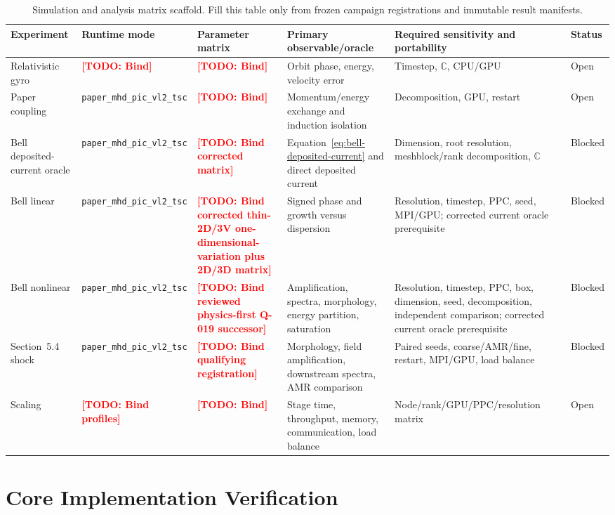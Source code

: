 \documentclass[twocolumn]{aastex701}
\newcommand{\runtime}{\texttt{paper\_mhd\_pic\_vl2\_tsc}\xspace}
\newcommand{\TODO}[1]{\textcolor{red}{\textbf{[TODO: #1]}}}
\begin{document}
\begin{table}[htbp]
\centering
\caption{Simulation and analysis matrix scaffold. Fill this table only from
frozen campaign registrations and immutable result manifests.}
\label{tab:simulation-matrix}
\small
\begin{tabular}{p{} p{} p{}
                p{} p{} p{}}
\toprule
Experiment & Runtime mode & Parameter matrix & Primary observable/oracle &
Required sensitivity and portability & Status \\
\midrule
Relativistic gyro & \TODO{Bind} & \TODO{Bind} &
Orbit phase, energy, velocity error & Timestep, $\mathbb{C}$, CPU/GPU &
Open \\
Paper coupling & \runtime & \TODO{Bind} &
Momentum/energy exchange and induction isolation & Decomposition, GPU, restart &
Open \\
Bell deposited-current oracle & \runtime & \TODO{Bind corrected matrix} &
Equation~\ref{eq:bell-deposited-current} and direct deposited current &
Dimension, root resolution, meshblock/rank decomposition, $\mathbb{C}$ &
Blocked \\
Bell linear & \runtime & \TODO{Bind corrected thin-2D/3V one-dimensional-
variation plus 2D/3D matrix} &
Signed phase and growth versus dispersion & Resolution, timestep, PPC, seed,
MPI/GPU; corrected current oracle prerequisite & Blocked \\
Bell nonlinear & \runtime & \TODO{Bind reviewed physics-first Q-019 successor} &
Amplification, spectra, morphology, energy partition, saturation &
Resolution, timestep, PPC, box, dimension, seed, decomposition, independent
comparison; corrected current oracle prerequisite & Blocked \\
Section~5.4 shock & \runtime & \TODO{Bind qualifying registration} &
Morphology, field amplification, downstream spectra, AMR comparison &
Paired seeds, coarse/AMR/fine, restart, MPI/GPU, load balance & Blocked \\
Scaling & \TODO{Bind profiles} & \TODO{Bind} &
Stage time, throughput, memory, communication, load balance &
Node/rank/GPU/PPC/resolution matrix & Open \\
\bottomrule
\end{tabular}
\end{table}

\section{Core Implementation Verification}
\label{sec:verification-results}
\end{document}
